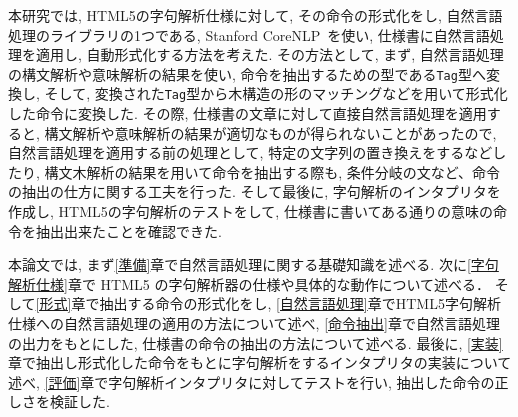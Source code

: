\documentclass[uplatex,a4j]{jsreport}
\begin{document}
本研究では, HTML5の字句解析仕様に対して, その命令の形式化をし, 
自然言語処理のライブラリの1つである, Stanford CoreNLP~\cite{manning-EtAl:2014:P14-5}を使い, 
仕様書に自然言語処理を適用し, 自動形式化する方法を考えた. 
その方法として, まず, 自然言語処理の構文解析や意味解析の結果を使い, 命令を抽出するための型である\texttt{Tag}型へ変換し, 
そして, 変換された\texttt{Tag}型から木構造の形のマッチングなどを用いて形式化した命令に変換した. 
その際, 仕様書の文章に対して直接自然言語処理を適用すると, 構文解析や意味解析の結果が適切なものが得られないことがあったので, 自然言語処理を適用する前の処理として, 特定の文字列の置き換えをするなどしたり, 
構文木解析の結果を用いて命令を抽出する際も, 条件分岐の文など、命令の抽出の仕方に関する工夫を行った. 
そして最後に, 字句解析のインタプリタを作成し, HTML5の字句解析のテストをして, 仕様書に書いてある通りの意味の命令を抽出出来たことを確認できた. 

本論文では, まず\ref{準備}章で自然言語処理に関する基礎知識を述べる.
次に\ref{字句解析仕様}章で HTML5 の字句解析器の仕様や具体的な動作について述べる．
そして\ref{形式}章で抽出する命令の形式化をし, 
\ref{自然言語処理}章でHTML5字句解析仕様への自然言語処理の適用の方法について述べ, 
\ref{命令抽出}章で自然言語処理の出力をもとにした, 仕様書の命令の抽出の方法について述べる. 
最後に, \ref{実装}章で抽出し形式化した命令をもとに字句解析をするインタプリタの実装について述べ, 
\ref{評価}章で字句解析インタプリタに対してテストを行い, 抽出した命令の正しさを検証した.
\end{document}
